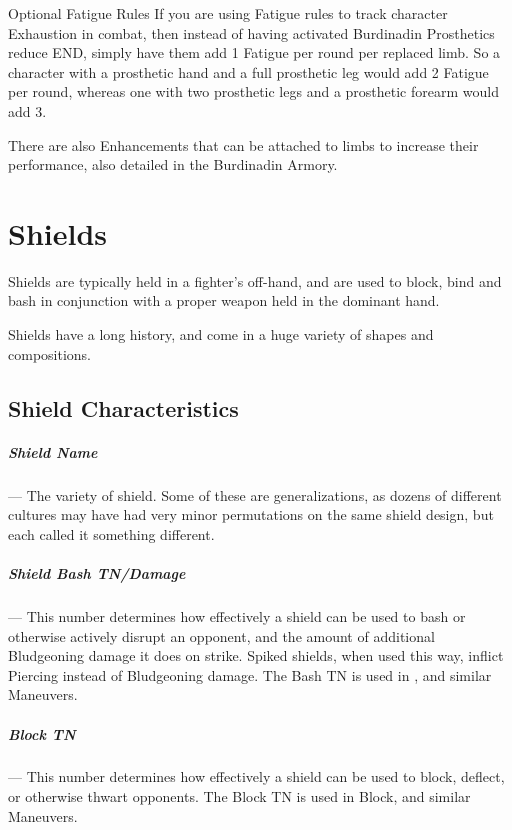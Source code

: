 \documentclass[oneside,11pt,english]{book}
\begin{document}
 

Optional Fatigue Rules 
If you are using Fatigue rules to track character Exhaustion in combat, then instead of having activated 
Burdinadin Prosthetics reduce END, simply have them add 1 Fatigue per round per replaced limb. So a 
character with a prosthetic hand and a full prosthetic leg would add 2 Fatigue per round, whereas one with 
two prosthetic legs and a prosthetic forearm would add 3. 

 

There are also Enhancements that can be attached to limbs to increase their performance, also detailed in 
the Burdinadin Armory. 
 
\chapter{Shields}\label{ch:Shields}
\startcontents[chapters]
\newpage
Shields are typically held in a fighter’s off-hand, and are used to block, bind and bash in conjunction with 
a proper weapon held in the dominant hand. 

Shields have a long history, and come in a huge variety of shapes and compositions.

\section{Shield Characteristics}
\paragraph{Shield Name}---\quad
The variety of shield. Some of these are generalizations, as dozens of different cultures may have had 
very minor permutations on the same shield design, but each called it something different. 


\vspace{-10pt}\paragraph{Shield Bash TN/Damage}---\quad
This number determines how effectively a shield can be used to bash or otherwise actively disrupt an opponent, and the amount of additional Bludgeoning damage it does on strike. Spiked shields, when used this way, inflict Piercing instead of Bludgeoning damage. The Bash TN is used in , and similar Maneuvers.

\vspace{-10pt}\paragraph{Block TN}---\quad
This number determines how effectively a shield can be used to block, deflect, or otherwise thwart 
opponents. The Block TN is used in Block, and similar Maneuvers. 
\end{document}
